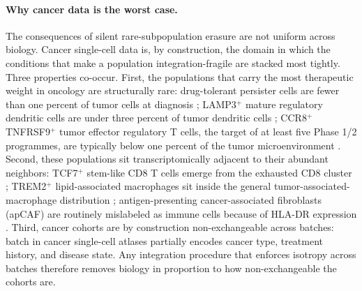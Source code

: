 
\paragraph{Why cancer data is the worst case.}
The consequences of silent rare-subpopulation erasure are not uniform across biology. Cancer single-cell data is, by construction, the domain in which the conditions that make a population integration-fragile are stacked most tightly. Three properties co-occur. First, the populations that carry the most therapeutic weight in oncology are structurally rare: drug-tolerant persister cells are fewer than one percent of tumor cells at diagnosis \citep{Rambow2018Cell,Shen2020Cell,Oren2021Nature,Marine2020NatRevCancer}; LAMP3$^+$ mature regulatory dendritic cells are under three percent of tumor dendritic cells \citep{Maier2020Nature}; CCR8$^+$TNFRSF9$^+$ tumor effector regulatory T cells, the target of at least five Phase 1/2 programmes, are typically below one percent of the tumor microenvironment \citep{Plitas2016Immunity,DeSimone2016Immunity,Wang2019Cell,VanDamme2021,Kidani2022PNAS}. Second, these populations sit transcriptomically adjacent to their abundant neighbors: TCF7$^+$ stem-like CD8 T cells emerge from the exhausted CD8 cluster \citep{Miller2019NatImmunol,Siddiqui2019Immunity}; TREM2$^+$ lipid-associated macrophages sit inside the general tumor-associated-macrophage distribution \citep{Molgora2020Cell,Katzenelenbogen2020Cell}; antigen-presenting cancer-associated fibroblasts (apCAF) are routinely mislabeled as immune cells because of HLA-DR expression \citep{Elyada2019CancerDiscov}. Third, cancer cohorts are by construction non-exchangeable across batches: batch in cancer single-cell atlases partially encodes cancer type, treatment history, and disease state. Any integration procedure that enforces isotropy across batches therefore removes biology in proportion to how non-exchangeable the cohorts are.

